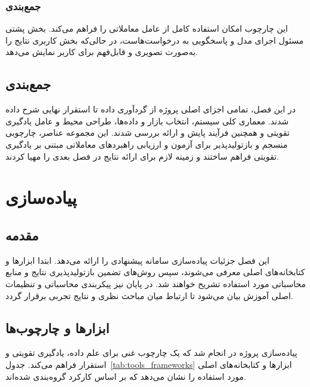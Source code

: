 \documentclass[12pt, a4paper]{report}
\begin{document}
\subsection{جمع‌بندی}
این چارچوب امکان استفاده کامل از عامل معاملاتی را فراهم می‌کند.  
بخش پشتی مسئول اجرای مدل و پاسخگویی به درخواست‌هاست، در حالی‌که بخش کاربری نتایج را به‌صورت تصویری و قابل‌فهم برای کاربر نمایش می‌دهد.  


\section{جمع‌بندی}

در این فصل، تمامی اجزای اصلی پروژه از گردآوری داده تا استقرار نهایی شرح داده شدند.  
معماری کلی سیستم، انتخاب بازار و داده‌ها، طراحی محیط و عامل یادگیری تقویتی و همچنین فرآیند پایش و ارائه بررسی شدند.  
این مجموعه عناصر، چارچوبی منسجم و بازتولیدپذیر برای آزمون و ارزیابی راهبردهای معاملاتی مبتنی بر یادگیری تقویتی فراهم ساختند و زمینه لازم برای ارائه نتایج در فصل بعدی را مهیا کردند.  



\chapter{پیاده‌سازی}

\section{مقدمه}

این فصل جزئیات پیاده‌سازی سامانه پیشنهادی را ارائه می‌دهد.  
ابتدا ابزارها و کتابخانه‌های اصلی معرفی می‌شوند، سپس روش‌های تضمین بازتولیدپذیری نتایج و منابع محاسباتی مورد استفاده تشریح خواهند شد.  
در پایان نیز پیکربندی محاسباتی و تنظیمات اصلی آموزش بیان می‌شود تا ارتباط میان مباحث نظری و نتایج تجربی برقرار گردد.  


\section{ابزارها و چارچوب‌ها}

پیاده‌سازی پروژه در  انجام شد که یک چارچوب غنی برای علم داده، یادگیری تقویتی و استقرار فراهم می‌کند.  
جدول~\ref{tab:tools_frameworks} ابزارها و کتابخانه‌های اصلی مورد استفاده را نشان می‌دهد که بر اساس کارکرد گروه‌بندی شده‌اند.  
\end{document}
